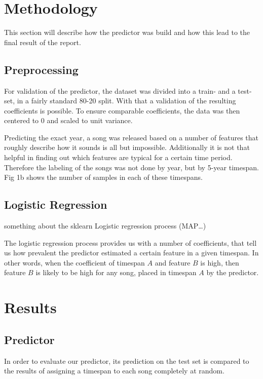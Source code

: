 \documentclass{article}
\begin{document}
\section{Methodology}
This section will describe how the predictor was build and how this lead to the final result of the report.

\subsection{Preprocessing}

For validation of the predictor, the dataset was divided into a train- and a test-set, in a fairly standard 80-20 split. With that a validation of the resulting coefficients is possible.
To ensure comparable coefficients, the data was then centered to 0 and scaled to unit variance. 

Predicting the exact year, a song was released based on a number of features that roughly describe how it sounds is all but impossible. Additionally it is not that helpful in finding out which features are typical for a certain time period.
Therefore the labeling of the songs was not done by year, but by 5-year timespan. Fig 1b \answerTODO{} shows the number of samples in each of these timespans.

\subsection{Logistic Regression}

\answerTODO something about the sklearn Logistic regression process (MAP\dots)

The logistic regression process provides us with a number of coefficients, that tell us how prevalent the predictor estimated a certain feature in a given timespan. In other words, when the coefficient of timespan $A$ and feature $B$ is high, then feature $B$ is likely to be high for any song, placed in timespan $A$ by the predictor.


\section{Results}

\subsection{Predictor}

In order to evaluate our predictor, its prediction on the test set is compared to the results of assigning a timespan to each song completely at random.
\end{document}
